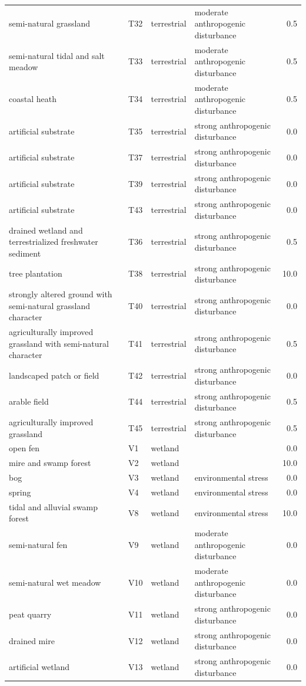 \documentclass[
]{article}
\begin{document}
\begin{landscape}
\begin{longtable}[t]{llllr}
semi-natural grassland & T32 & terrestrial & moderate anthropogenic disturbance & 0.5\\
semi-natural tidal and salt meadow & T33 & terrestrial & moderate anthropogenic disturbance & 0.5\\
coastal heath & T34 & terrestrial & moderate anthropogenic disturbance & 0.5\\
artificial substrate & T35 & terrestrial & strong anthropogenic disturbance & 0.0\\
\addlinespace
artificial substrate & T37 & terrestrial & strong anthropogenic disturbance & 0.0\\
artificial substrate & T39 & terrestrial & strong anthropogenic disturbance & 0.0\\
artificial substrate & T43 & terrestrial & strong anthropogenic disturbance & 0.0\\
drained wetland and terrestrialized freshwater sediment & T36 & terrestrial & strong anthropogenic disturbance & 0.5\\
tree plantation & T38 & terrestrial & strong anthropogenic disturbance & 10.0\\
\addlinespace
strongly altered ground with semi-natural grassland character & T40 & terrestrial & strong anthropogenic disturbance & 0.0\\
agriculturally improved grassland with semi-natural character & T41 & terrestrial & strong anthropogenic disturbance & 0.5\\
landscaped patch or field & T42 & terrestrial & strong anthropogenic disturbance & 0.0\\
arable field & T44 & terrestrial & strong anthropogenic disturbance & 0.5\\
agriculturally improved grassland & T45 & terrestrial & strong anthropogenic disturbance & 0.5\\
\addlinespace
open fen & V1 & wetland &  & 0.0\\
mire and swamp forest & V2 & wetland &  & 10.0\\
bog & V3 & wetland & environmental stress & 0.0\\
spring & V4 & wetland & environmental stress & 0.0\\
tidal and alluvial swamp forest & V8 & wetland & environmental stress & 10.0\\
\addlinespace
semi-natural fen & V9 & wetland & moderate anthropogenic disturbance & 0.0\\
semi-natural wet meadow & V10 & wetland & moderate anthropogenic disturbance & 0.0\\
peat quarry & V11 & wetland & strong anthropogenic disturbance & 0.0\\
drained mire & V12 & wetland & strong anthropogenic disturbance & 0.0\\
artificial wetland & V13 & wetland & strong anthropogenic disturbance & 0.0\\*
\end{longtable}
\end{landscape}
\end{document}
